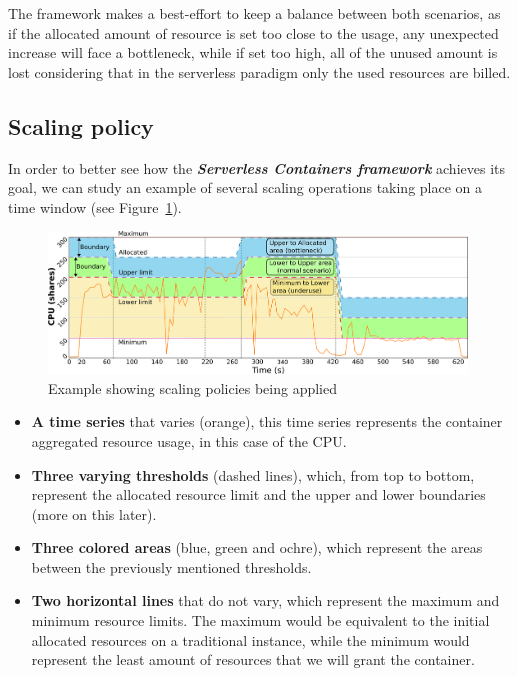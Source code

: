 \documentclass[12pt]{article}
\begin{document}
The framework makes a best-effort to keep a balance between both scenarios, as if the allocated amount of resource is set too close to the usage, any unexpected increase will face a bottleneck, while if set too high, all of the unused amount is lost considering that in the serverless paradigm only the used resources are billed.

\subsection{Scaling policy}

In order to better see how the \textbf{\textit{Serverless Containers framework}} achieves its goal, we can study an example of several scaling operations taking place on a time window (see Figure~\ref{fig:ScalingPolicy}).

\begin{figure}[!tb]
	\centering
	\includegraphics[width=0.99\textwidth]{../img/use_case/timeseries.png}
	\caption{Example showing scaling policies being applied}
	\label{fig:ScalingPolicy}
\end{figure}

\begin{itemize}
	\item \textbf{A time series} that varies (orange), this time series represents the container aggregated resource usage, in this case of the CPU.
	\item \textbf{Three varying thresholds} (dashed lines), which, from top to bottom, represent the allocated resource limit and the upper and lower boundaries (more on this later).
	\item \textbf{Three colored areas} (blue, green and ochre), which represent the areas between the previously mentioned thresholds.
	\item \textbf{Two horizontal lines} that do not vary, which represent the maximum and minimum resource limits. The maximum would be equivalent to the initial allocated resources on a traditional instance, while the minimum would represent the least amount of resources that we will grant the container.
\end{itemize}
\end{document}
